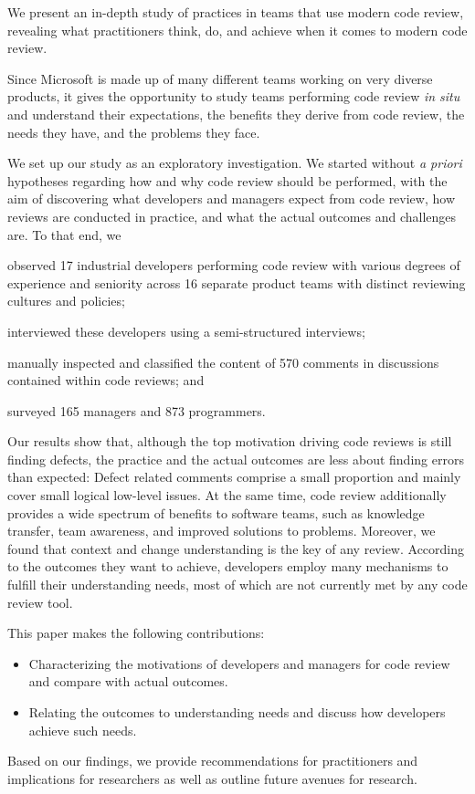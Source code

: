 We present an in-depth study of practices in teams that use modern code review,
revealing what practitioners think, do, and achieve when it comes to modern
code review.

Since Microsoft is made up of many different teams working on very diverse
products, it gives the opportunity to study teams performing code review \emph{in
situ} and understand their expectations, the benefits they derive from code
review, the needs they have, and the problems they face.

We set up our study as an exploratory investigation. We started without \emph{a
priori} hypotheses regarding how and why code review should be performed, with
the aim of discovering what developers and managers expect from code review,
how reviews are conducted in practice, and what the actual outcomes and
challenges are. To that end, we \begin{inparaenum}[(1)] 
\item observed 17 industrial developers performing code review with various degrees of experience and seniority across 16 separate product teams with distinct reviewing cultures and policies; 
\item interviewed these developers using a semi-structured interviews; 
\item manually inspected and classified the content of 570 comments in discussions contained within code reviews; and 
\item surveyed 165 managers and 873 programmers.
\end{inparaenum}

Our results show that, although the top motivation driving code reviews is
still finding defects, the practice and the actual outcomes are less about
finding errors than expected: Defect related comments comprise a small
proportion and mainly cover small logical low-level issues. At the same time,
code review additionally provides a wide spectrum of benefits to software
teams, such as knowledge transfer, team awareness, and improved solutions to
problems. Moreover, we found that context and change understanding is the key
of any review. According to the outcomes they want to achieve, developers
employ many mechanisms to fulfill their understanding needs, most of which are
not currently met by any code review tool.

This paper makes the following contributions:
\begin{itemize}
  \item Characterizing the motivations of developers and managers for code review and compare with actual outcomes.
  \item Relating the outcomes to understanding needs and discuss how developers achieve such needs.
\end{itemize}

Based on our findings, we provide recommendations for practitioners and
implications for researchers as well as outline future avenues for research.